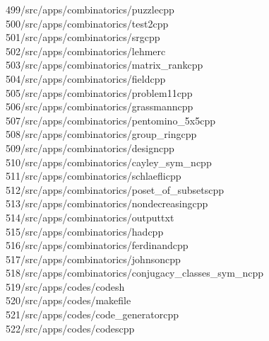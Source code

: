 \begin{tabbing}
499\>/src/apps/combinatorics/puzzlecpp\\[0pt]
500\>/src/apps/combinatorics/test2cpp\\[0pt]
501\>/src/apps/combinatorics/srgcpp\\[0pt]
502\>/src/apps/combinatorics/lehmerc\\[0pt]
503\>/src/apps/combinatorics/matrix\_rankcpp\\[0pt]
504\>/src/apps/combinatorics/fieldcpp\\[0pt]
505\>/src/apps/combinatorics/problem11cpp\\[0pt]
506\>/src/apps/combinatorics/grassmanncpp\\[0pt]
507\>/src/apps/combinatorics/pentomino\_5x5cpp\\[0pt]
508\>/src/apps/combinatorics/group\_ringcpp\\[0pt]
509\>/src/apps/combinatorics/designcpp\\[0pt]
510\>/src/apps/combinatorics/cayley\_sym\_ncpp\\[0pt]
511\>/src/apps/combinatorics/schlaeflicpp\\[0pt]
512\>/src/apps/combinatorics/poset\_of\_subsetscpp\\[0pt]
513\>/src/apps/combinatorics/nondecreasingcpp\\[0pt]
514\>/src/apps/combinatorics/outputtxt\\[0pt]
515\>/src/apps/combinatorics/hadcpp\\[0pt]
516\>/src/apps/combinatorics/ferdinandcpp\\[0pt]
517\>/src/apps/combinatorics/johnsoncpp\\[0pt]
518\>/src/apps/combinatorics/conjugacy\_classes\_sym\_ncpp\\[0pt]
519\>/src/apps/codes/codesh\\[0pt]
520\>/src/apps/codes/makefile\\[0pt]
521\>/src/apps/codes/code\_generatorcpp\\[0pt]
522\>/src/apps/codes/codescpp\\[0pt]

\end{tabbing}
